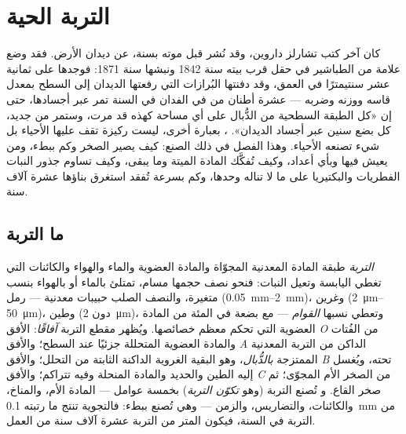 \chapter{التربة الحية}\label{ch:b2:living-soil}

كان آخر كتب تشارلز داروين، وقد نُشر قبل موته بسنة،
عن ديدان الأرض. فقد وضع علامة من الطباشير في حقل قرب
بيته سنة 1842 ونبشها سنة 1871: فوجدها على ثمانية عشر سنتيمترًا
في العمق، وقد دفنتها البُرازات التي رفعتها الديدان إلى السطح
بمعدل قاسه ووزنه وضربه --- عشرة أطنان من
 في الفدان في السنة تمر عبر أجسادها، حتى إن
«كل الطبقة السطحية من الدُّبال على أي مساحة كهذه قد
مرت، وستمر من جديد، كل بضع سنين عبر أجساد
الديدان». ، بعبارة أخرى، ليست ركيزة تقف عليها
الأحياء بل شيء تصنعه الأحياء. وهذا الفصل
في ذلك الصنع: كيف يصير الصخر  وكم ببطء، ومن
يعيش فيها وبأي أعداد، وكيف تُفكَّك المادة الميتة وما
يبقى، وكيف تساوم جذور النبات الفطريات والبكتيريا على ما لا
تناله وحدها، وكم بسرعة تُفقد  استغرق بناؤها عشرة آلاف سنة.

\section{ما التربة}

\begin{definition}\label{def:b2:living-soil:soil}
\emph{التربة} طبقة المادة المعدنية المجوّاة والمادة العضوية
والماء والهواء والكائنات التي تغطي اليابسة وتعيل
النبات: فنحو نصف حجمها مسام، تمتلئ بالماء أو بالهواء
بنسب متغيرة، والنصف الصلب حبيبات معدنية ---
رمل (\qtyrange{0.05}{2}{mm})، وغرين (\qtyrange{2}{50}{\micro m})،
وطين (دون \qty{2}{\micro m})، وتعطي نسبها
\emph{القوام} --- مع بضعة في المئة من المادة العضوية التي
تحكم معظم خصائصها. ويُظهر مقطع التربة
\emph{آفاقًا}: الأفق \emph{O} من الفُتات والمادة العضوية المتحللة
جزئيًا عند السطح؛ والأفق \emph{A} الداكن من التربة
المعدنية الممتزجة \emph{بالدُّبال}، وهو البقية الغروية الداكنة الثابتة
من التحلل؛ والأفق \emph{B} تحته، ويُغسل إليه الطين
والحديد والمادة المنحلة وفيه تتراكم؛
والأفق \emph{C} من الصخر الأم المجوّى؛ ثم صخر القاع. و
تُصنع التربة (وهو \emph{تكوّن التربة}) بخمسة عوامل --- المادة
الأم، والمناخ، والكائنات، والتضاريس، والزمن --- وهي
تُصنع ببطء: فالتجوية تنتج ما رتبته \qty{0.1}{mm} من
التربة في السنة، فيكون المتر من التربة عشرة آلاف سنة من العمل.
\end{definition}

